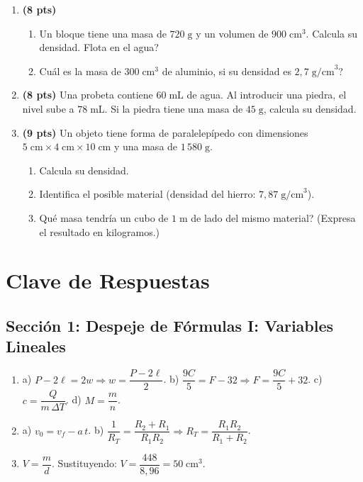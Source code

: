 \documentclass[12pt, letterpaper]{article}
\begin{document}
\begin{enumerate}[leftmargin=*]
  \item \textbf{(8 pts)}
        \begin{enumerate}[label=\alph*)]
          \item Un bloque tiene una masa de $720\;\text{g}$ y un volumen de $900\;\text{cm}^3$. Calcula su densidad. \textquestiondown Flota en el agua?
          \item \textquestiondown Cuál es la masa de $300\;\text{cm}^3$ de aluminio, si su densidad es $2{,}7\;\text{g/cm}^3$?
        \end{enumerate}

  \item \textbf{(8 pts)} Una probeta contiene $60\;\text{mL}$ de agua. Al introducir una piedra, el nivel sube a $78\;\text{mL}$. Si la piedra tiene una masa de $45\;\text{g}$, calcula su densidad.

  \item \textbf{(9 pts)} Un objeto tiene forma de paralelepípedo con dimensiones $5\;\text{cm} \times 4\;\text{cm} \times 10\;\text{cm}$ y una masa de $1\,580\;\text{g}$.
        \begin{enumerate}[label=\alph*)]
          \item Calcula su densidad.
          \item Identifica el posible material (densidad del hierro: $7{,}87\;\text{g/cm}^3$).
          \item \textquestiondown Qué masa tendría un cubo de $1\;\text{m}$ de lado del mismo material? (Expresa el resultado en kilogramos.)
        \end{enumerate}
\end{enumerate}

\newpage

\ifmwclaves
  \section{Clave de Respuestas}

  \subsection*{Sección 1: Despeje de Fórmulas I: Variables Lineales}

  \begin{enumerate}[leftmargin=*, label=\textbf{\arabic*.}]
    \item a) $P - 2\ell = 2w \Rightarrow w = \dfrac{P - 2\ell}{2}$. \quad
          b) $\dfrac{9C}{5} = F - 32 \Rightarrow F = \dfrac{9C}{5} + 32$. \quad
          c) $c = \dfrac{Q}{m\,\Delta T}$. \quad
          d) $M = \dfrac{m}{n}$.

    \item a) $v_0 = v_f - a\,t$. \quad
          b) $\dfrac{1}{R_T} = \dfrac{R_2 + R_1}{R_1 R_2} \Rightarrow R_T = \dfrac{R_1 R_2}{R_1 + R_2}$.

    \item $V = \dfrac{m}{d}$. \quad Sustituyendo: $V = \dfrac{448}{8{,}96} = 50\;\text{cm}^3$.
  \end{enumerate}
\end{document}
